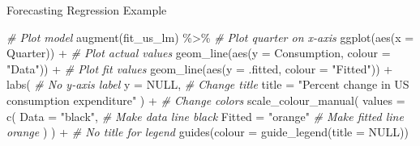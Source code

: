 \documentclass[
  ignorenonframetext,
]{beamer}
\newenvironment{Shaded}{\begin{snugshade}}{\end{snugshade}}
\newcommand{\AttributeTok}[1]{\textcolor[rgb]{0.77,0.63,0.00}{#1}}
\newcommand{\CommentTok}[1]{\textcolor[rgb]{0.56,0.35,0.01}{\textit{#1}}}
\newcommand{\ConstantTok}[1]{\textcolor[rgb]{0.00,0.00,0.00}{#1}}
\newcommand{\FunctionTok}[1]{\textcolor[rgb]{0.00,0.00,0.00}{#1}}
\newcommand{\NormalTok}[1]{#1}
\newcommand{\SpecialCharTok}[1]{\textcolor[rgb]{0.00,0.00,0.00}{#1}}
\newcommand{\StringTok}[1]{\textcolor[rgb]{0.31,0.60,0.02}{#1}}
\begin{document}
\begin{frame}[fragile]{Forecasting \textbar{} \small Regression Example}
\protect\hypertarget{forecasting-regression-example-5}{}
\tiny

\normalfont

\tiny

\begin{Shaded}
\begin{Highlighting}[]
\CommentTok{\# Plot model}
\FunctionTok{augment}\NormalTok{(fit\_us\_lm) }\SpecialCharTok{\%\textgreater{}\%}
  \CommentTok{\# Plot quarter on x{-}axis}
  \FunctionTok{ggplot}\NormalTok{(}\FunctionTok{aes}\NormalTok{(}\AttributeTok{x =}\NormalTok{ Quarter)) }\SpecialCharTok{+}
  \CommentTok{\# Plot actual values}
  \FunctionTok{geom\_line}\NormalTok{(}\FunctionTok{aes}\NormalTok{(}\AttributeTok{y =}\NormalTok{ Consumption, }\AttributeTok{colour =} \StringTok{"Data"}\NormalTok{)) }\SpecialCharTok{+}
  \CommentTok{\# Plot fit values}
  \FunctionTok{geom\_line}\NormalTok{(}\FunctionTok{aes}\NormalTok{(}\AttributeTok{y =}\NormalTok{ .fitted, }\AttributeTok{colour =} \StringTok{"Fitted"}\NormalTok{)) }\SpecialCharTok{+}
  \FunctionTok{labs}\NormalTok{(}
    \CommentTok{\# No y{-}axis label}
    \AttributeTok{y =} \ConstantTok{NULL}\NormalTok{, }
    \CommentTok{\# Change title}
    \AttributeTok{title =} \StringTok{"Percent change in US consumption expenditure"}
\NormalTok{  ) }\SpecialCharTok{+}
  \CommentTok{\# Change colors}
  \FunctionTok{scale\_colour\_manual}\NormalTok{(}
    \AttributeTok{values =} \FunctionTok{c}\NormalTok{(}
      \AttributeTok{Data =} \StringTok{"black"}\NormalTok{, }\CommentTok{\# Make data line black}
      \AttributeTok{Fitted =} \StringTok{"orange"} \CommentTok{\# Make fitted line orange}
\NormalTok{    )}
\NormalTok{  ) }\SpecialCharTok{+}
  \CommentTok{\# No title for legend}
  \FunctionTok{guides}\NormalTok{(}\AttributeTok{colour =} \FunctionTok{guide\_legend}\NormalTok{(}\AttributeTok{title =} \ConstantTok{NULL}\NormalTok{))}
\end{Highlighting}
\end{Shaded}

\normalfont
\end{frame}
\end{document}

